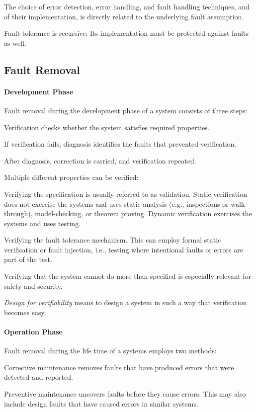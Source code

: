 The choice of error detection, error handling, and fault handling techniques, and of their implementation, is directly related to the underlying fault assumption.

Fault tolerance is recursive: Its implementation must be protected against faults as well.


\subsection{Fault Removal}

\paragraph{Development Phase}
Fault removal during the development phase of a system consists of three steps:
\begin{compactitem}
 \item Verification checks whether the system satisfies required properties.
 \item If verification fails, diagnosis identifies the faults that prevented verification.
 \item After diagnosis, correction is carried, and verification repeated.
\end{compactitem}

Multiple different properties can be verified:
\begin{compactitem}
 \item Verifying the specification is usually referred to as validation.
Static verification does not exercise the systems and uses static analysis (e.g., inspections or walk-through), model-checking, or theorem proving.
Dynamic verification exercises the systems and uses testing.
\item Verifying the fault tolerance mechanism.
This can employ formal static verification or fault injection, i.e., testing where intentional faults or errors are part of the test.
\item Verifying that the system cannot do more than specified is especially relevant for safety and security.
\end{compactitem}

\emph{Design for verifiability} means to design a system in such a way that verification becomes easy.

\paragraph{Operation Phase}
Fault removal during the life time of a systems employs two methods:
\begin{compactitem}
\item Corrective maintenance removes faults that have produced errors that were detected and reported.
\item Preventive maintenance uncovers faults before they cause errors.
This may also include design faults that have caused errors in similar systems.
\end{compactitem}

